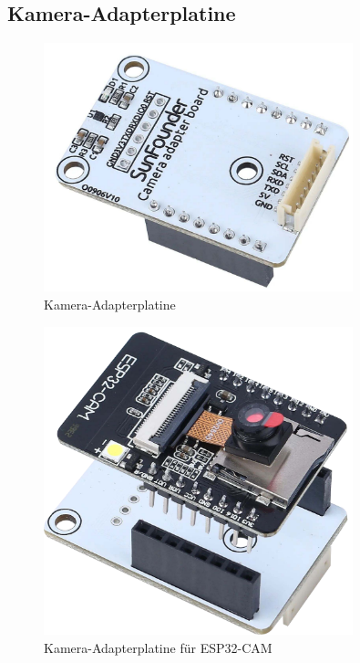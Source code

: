 \documentclass{vorlage-design-main}
\begin{document}
\hypertarget{kamera-adapterplatine}{%
\subsection{Kamera-Adapterplatine}\label{kamera-adapterplatine}}

\begin{figure}
\centering
\includegraphics[width=0.8\textwidth]{images/cam_adapter_board.pdf}
\floatnotes{}
\caption{Kamera-Adapterplatine}
\end{figure}

\begin{figure}
\centering
\includegraphics[width=0.8\textwidth]{images/cam_adapter_esp32cam.pdf}
\floatnotes{}
\caption{Kamera-Adapterplatine für ESP32-CAM}
\end{figure}
\end{document}
